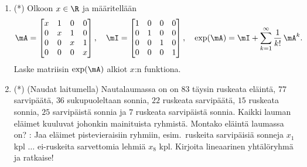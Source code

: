 \begin{enumerate}
\item (*) 
Olkoon $x\in\R$ ja määritellään
\[
\mA       = \begin{bmatrix} x&1&0&0\\0&x&1&0\\0&0&x&1\\0&0&0&x\end{bmatrix}, \quad
\mI=\begin{bmatrix} 1&0&0&0\\0&1&0&0\\0&0&1&0\\0&0&0&1 \end{bmatrix}, \quad
\exp(\mA) = \mI+\sum_{k=1}^\infty \frac{1}{k!}\,\mA^k.
\]
Laske matriisin $\exp(\mA)$ alkiot $x$:n funktiona.

\item (*) 
(Naudat laitumella) Nautalaumassa on on $83$ täysin ruskeata eläintä, $77$ sarvipäätä,
$36$ sukupuoleltaan sonnia, $22$ ruskeata sarvipäätä, $15$ ruskeata sonnia, $25$ sarvipäistä
sonnia ja $7$ ruskeata sarvipäistä sonnia. Kaikki lauman eläimet kuuluvat johonkin mainituista
ryhmistä. Montako eläintä laumassa on? : Jaa eläimet pistevieraisiin ryhmiin,
esim.\ ruskeita sarvipäisiä sonneja $x_1$ kpl $\ldots$ ei-ruskeita sarvettomia lehmiä
$x_8$ kpl. Kirjoita lineaarinen yhtälöryhmä ja ratkaise!

\end{enumerate}
